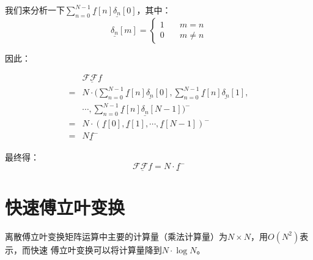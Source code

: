 我们来分析一下$\sum_{n=0}^{N-1}\underline{f}[n]\underline{\delta_n}[0]$，其中：
$$
	\underline{\delta_n}[m]=\begin{cases} 1 & \quad m=n     \\
		0 & \quad m\neq n\end{cases}
$$

因此：

\begin{align*}
	  & \underline{\mathcal{F}\mathcal{F}f}                                                                                      \\
	= & N\cdot (\sum_{n=0}^{N-1}\underline{f}[n]\underline{\delta_n}[0],\sum_{n=0}^{N-1}\underline{f}[n]\underline{\delta_n}[1], \\
	  & \cdots,\sum_{n=0}^{N-1}\underline{f}[n]\underline{\delta_n}[N-1])^-                                                      \\
	= & N\cdot (\underline{f}[0],\underline{f}[1],\cdots,\underline{f}[N-1])^-                                                   \\
	= & N\underline{f}^-
\end{align*}

最终得：
\begin{equation}
	\underline{\mathcal{F}\mathcal{F}f} = N\cdot \underline{f}^-
\end{equation}

\section{快速傅立叶变换}
离散傅立叶变换矩阵运算中主要的计算量（乘法计算量）为$N \times N$，用$O(N^2)$表示，而快速 傅立叶变换可以将计算量降到$N\cdot \log{N}$。
